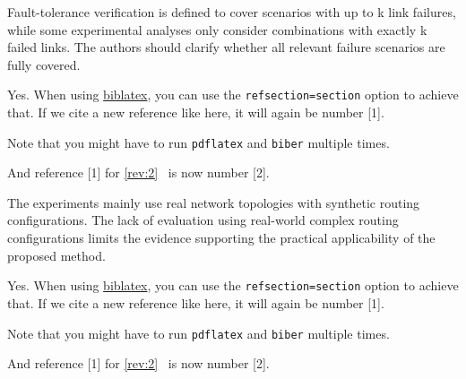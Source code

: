 \begin{revcomment}
	Fault-tolerance verification is defined to cover scenarios with up to k link failures, 
	while some experimental analyses only consider combinations with exactly k failed links. 
	The authors should clarify whether all relevant failure scenarios are fully covered.
\end{revcomment}
\begin{revresponse}
	Yes. When using \href{https://www.ctan.org/pkg/biblatex}{biblatex}, you can use the \texttt{refsection=section} option to achieve that.
	If we cite a new reference like \cite{Besser2021} here, it will again be number [1].

	Note that you might have to run \texttt{pdflatex} and \texttt{biber} multiple times.

	And reference [1] for \autoref{rev:2}~\cite{ReviewerReference} is now number [2].
\end{revresponse}

\begin{revcomment}
	The experiments mainly use real network topologies with synthetic routing configurations. 
	The lack of evaluation using real-world complex routing configurations limits the evidence supporting the practical applicability of the proposed method.
\end{revcomment}
\begin{revresponse}
	Yes. When using \href{https://www.ctan.org/pkg/biblatex}{biblatex}, you can use the \texttt{refsection=section} option to achieve that.
	If we cite a new reference like \cite{Besser2021} here, it will again be number [1].

	Note that you might have to run \texttt{pdflatex} and \texttt{biber} multiple times.

	And reference [1] for \autoref{rev:2}~\cite{ReviewerReference} is now number [2].
\end{revresponse}

